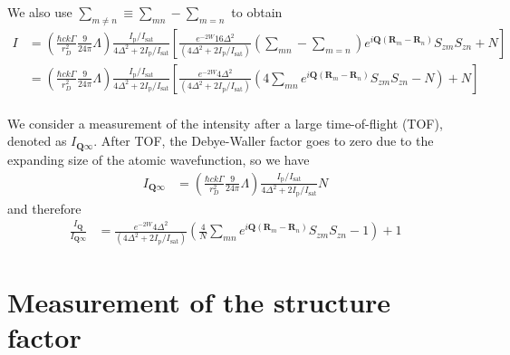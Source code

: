\documentclass[11pt,letter]{article}
\newcommand{\bv}[1]{\ensuremath{\bm{#1}}}
\newcommand{\iisat}{\ensuremath{I_{\mathrm{p}}/I_{\mathrm{sat}}}}
\newcommand{\Iqtof}{\ensuremath{I_{\bv{Q}\infty} }}
\newcommand{\Iq}{\ensuremath{I_{\bv{Q}} }}
\begin{document}
We also use $\sum_{m\neq n} \equiv \sum_{mn} - \sum_{m=n}$ to obtain  
\begin{equation}
\begin{split} 
 I 
&  =
  \left( 
 \frac{\hbar c k \Gamma}{r_{D}^{2}}  
     \frac{9}{24\pi} \Lambda 
  \right) 
  \frac{ \iisat }{ 4 \Delta^{2} + 2 \iisat }
  \left[
      \frac{ e^{-2W}16 \Delta^{2}  } 
           {(4 \Delta^{2} + 2 \iisat) } 
   \left( \sum_{mn} - \sum_{m=n} \right) 
      e^{ i \bv{Q}( \bv{R}_{m} - \bv{R}_{n} ) } 
      S_{zm}S_{zn}
  + N 
   \right]  \\ 
&  =
  \left( 
 \frac{\hbar c k \Gamma}{r_{D}^{2}}  
     \frac{9}{24\pi} \Lambda 
  \right) 
  \frac{ \iisat }{ 4 \Delta^{2} + 2 \iisat }
  \left[
      \frac{ e^{-2W}4 \Delta^{2}  } 
           {(4 \Delta^{2} + 2 \iisat) } 
   \left( 4\sum_{mn}  
      e^{ i \bv{Q}( \bv{R}_{m} - \bv{R}_{n} ) } 
      S_{zm}S_{zn}
     - N \right)
  + N 
   \right]  \\ 
\end{split}
\label{eq:iscatt-large-detuning}
\end{equation}


We consider a measurement of the intensity after a large time-of-flight (TOF),
denoted as $\Iqtof$.  After TOF, the Debye-Waller factor goes to zero due to
the expanding size of the atomic wavefunction, so we have 
\begin{equation}
\begin{split} 
 \Iqtof
&  =
  \left( 
 \frac{\hbar c k \Gamma}{r_{D}^{2}}  
     \frac{9}{24\pi} \Lambda 
  \right) 
  \frac{ \iisat }{ 4 \Delta^{2} + 2 \iisat } N 
\end{split}
\end{equation}
and therefore
\begin{equation}
\begin{split} 
 \frac{\Iq}{\Iqtof} 
&  =
      \frac{ e^{-2W}4 \Delta^{2}  } 
           {(4 \Delta^{2} + 2 \iisat) } 
   \left(
      \frac{4}{N}\sum_{mn}  
      e^{ i \bv{Q}( \bv{R}_{m} - \bv{R}_{n} ) } 
      S_{zm}S_{zn}
     - 1 \right)
  + 1 
\end{split}
\label{eq:IscattQ}
\end{equation}




\section{Measurement of the structure factor} 
\end{document}
